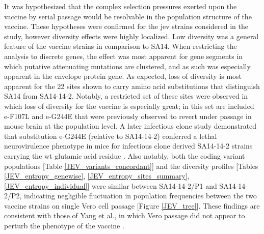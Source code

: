 It was hypothesized that the complex selection pressures exerted upon the vaccine by serial passage would be resolvable in the population structure of the vaccine. These hypotheses were confirmed for the \gls{jev} strains considered in the study, however diversity effects were highly localized. Low diversity was a general feature of the vaccine strains in comparison to SA14. When restricting the analysis to discrete genes, the effect was most apparent for gene segments in which putative attenuating mutations are clustered, and as such was especially apparent in the envelope protein gene. As expected, loss of diversity is most apparent for the 22 sites shown to carry amino acid substitutions that distinguish SA14 from SA14-14-2. Notably, a restricted set of these sites were observed in which loss of diversity for the vaccine is especially great; in this set are included \gls{e}-F107L and \gls{e}-G244E that were previously observed to revert under passage in mouse brain at the population level. A later infectious clone study demonstrated that substitution \gls{e}-G244E (relative to SA14-14-2) conferred a lethal neurovirulence phenotype in mice for infectious clone derived SA14-14-2 strains carrying the \gls{wt} glutamic acid residue \parencite{Yun:2014jr}. Also notably, both the coding variant populations [Table \ref{JEV_variants_concordant}] and the diversity profiles [Tables \ref{JEV_entropy_genewise}, \ref{JEV_entropy_sites_summary}, \ref{JEV_entropy_individual}] were similar between SA14-14-2/P1 and SA14-14-2/P2, indicating negligible fluctuation in population frequencies between the two vaccine strains on single Vero cell passage [Figure \ref{JEV_tree}]. These findings are consistent with those of Yang et al., in which Vero passage did not appear to perturb the phenotype of the vaccine \parencite{Yang:2014io}. 

